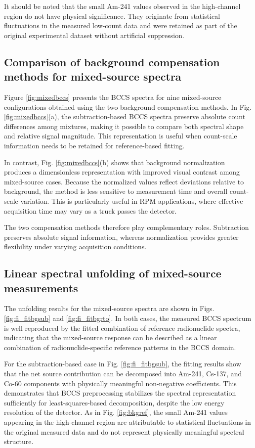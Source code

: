 \documentclass[10pt]{wlscirep}
\begin{document}
It should be noted that the small Am-241 values observed in the high-channel region do not have physical significance. They originate from statistical fluctuations in the measured low-count data and were retained as part of the original experimental dataset without artificial suppression.

\subsection*{Comparison of background compensation methods for mixed-source spectra}

Figure \ref{fig:mixedbccs} presents the BCCS spectra for nine mixed-source configurations obtained using the two background compensation methods. In Fig.\ref{fig:mixedbccs}(a), the subtraction-based BCCS spectra preserve absolute count differences among mixtures, making it possible to compare both spectral shape and relative signal magnitude. This representation is useful when count-scale information needs to be retained for reference-based fitting.

In contrast, Fig. \ref{fig:mixedbccs}(b) shows that background normalization produces a dimensionless representation with improved visual contrast among mixed-source cases. Because the normalized values reflect deviations relative to background, the method is less sensitive to measurement time and overall count-scale variation. This is particularly useful in RPM applications, where effective acquisition time may vary as a truck passes the detector.

The two compensation methods therefore play complementary roles. Subtraction preserves absolute signal information, whereas normalization provides greater flexibility under varying acquisition conditions.


\subsection*{Linear spectral unfolding of mixed-source measurements}

The unfolding results for the mixed-source spectra are shown in Figs. \ref{fig:fi_fitbgsub} and \ref{fig:fi_fitbgrto}. In both cases, the measured BCCS spectrum is well reproduced by the fitted combination of reference radionuclide spectra, indicating that the mixed-source response can be described as a linear combination of radionuclide-specific reference patterns in the BCCS domain.

For the subtraction-based case in Fig. \ref{fig:fi_fitbgsub}, the fitting results show that the net source contribution can be decomposed into Am-241, Cs-137, and Co-60 components with physically meaningful non-negative coefficients. This demonstrates that BCCS preprocessing stabilizes the spectral representation sufficiently for least-squares-based decomposition, despite the low energy resolution of the detector. As in Fig. \ref{fig:bkgref}, the small Am-241 values appearing in the high-channel region are attributable to statistical fluctuations in the original measured data and do not represent physically meaningful spectral structure.
\end{document}
